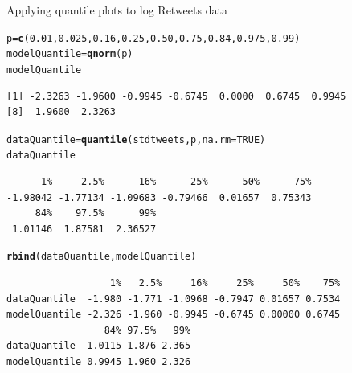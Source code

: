 \documentclass{beamer}\usepackage[]{graphicx}\usepackage[]{color}
\makeatletter
\newcommand{\hlnum}[1]{\textcolor[rgb]{0.2,0.2,0.2}{#1}}%
\newcommand{\hlstd}[1]{\textcolor[rgb]{0.102,0.102,0.102}{#1}}%
\newcommand{\hlkwb}[1]{\textcolor[rgb]{0.102,0.102,0.102}{#1}}%
\newcommand{\hlkwc}[1]{\textcolor[rgb]{0.2,0.2,0.2}{#1}}%
\newcommand{\hlkwd}[1]{\textcolor[rgb]{0.102,0.102,0.102}{\textbf{#1}}}%
\newenvironment{kframe}{%
 \def\at@end@of@kframe{}%
 \ifinner\ifhmode%
  \def\at@end@of@kframe{\end{minipage}}%
  \begin{minipage}{\columnwidth}%
 \fi\fi%
 \def\FrameCommand##1{\hskip\@totalleftmargin \hskip-\fboxsep
 \colorbox{shadecolor}{##1}\hskip-\fboxsep
     \hskip-\linewidth \hskip-\@totalleftmargin \hskip\columnwidth}%
 \MakeFramed {\advance\hsize-\width
   \@totalleftmargin\z@ \linewidth\hsize
   \@setminipage}}%
 {\par\unskip\endMakeFramed%
 \at@end@of@kframe}
\newenvironment{knitrout}{}{} %
\renewenvironment{knitrout}{\begin{spacing}{0.75}\begin{tiny}}{\end{tiny}\end{spacing}}
\makeatother
\begin{document}
\begin{frame}{Applying quantile plots to log Retweets data}
\begin{knitrout}\small
{}\color{fgcolor}\begin{kframe}
\begin{alltt}
\hlstd{p} \hlkwb{=} \hlkwd{c}\hlstd{(}\hlnum{0.01}\hlstd{,} \hlnum{0.025}\hlstd{,} \hlnum{0.16}\hlstd{,} \hlnum{0.25}\hlstd{,} \hlnum{0.50}\hlstd{,} \hlnum{0.75}\hlstd{,} \hlnum{0.84}\hlstd{,} \hlnum{0.975}\hlstd{,} \hlnum{0.99}\hlstd{)}
\hlstd{modelQuantile} \hlkwb{=} \hlkwd{qnorm}\hlstd{(p)}
\hlstd{modelQuantile}
\end{alltt}
\begin{verbatim}
[1] -2.3263 -1.9600 -0.9945 -0.6745  0.0000  0.6745  0.9945
[8]  1.9600  2.3263
\end{verbatim}
\begin{alltt}
\hlstd{dataQuantile} \hlkwb{=} \hlkwd{quantile}\hlstd{(stdtweets, p,} \hlkwc{na.rm}\hlstd{=}\hlnum{TRUE}\hlstd{)}
\hlstd{dataQuantile}
\end{alltt}
\begin{verbatim}
      1%     2.5%      16%      25%      50%      75% 
-1.98042 -1.77134 -1.09683 -0.79466  0.01657  0.75343 
     84%    97.5%      99% 
 1.01146  1.87581  2.36527 
\end{verbatim}
\begin{alltt}
\hlkwd{rbind}\hlstd{(dataQuantile, modelQuantile)}
\end{alltt}
\begin{verbatim}
                  1%   2.5%     16%     25%     50%    75%
dataQuantile  -1.980 -1.771 -1.0968 -0.7947 0.01657 0.7534
modelQuantile -2.326 -1.960 -0.9945 -0.6745 0.00000 0.6745
                 84% 97.5%   99%
dataQuantile  1.0115 1.876 2.365
modelQuantile 0.9945 1.960 2.326
\end{verbatim}
\end{kframe}
\end{knitrout}
\end{frame}
\end{document}
